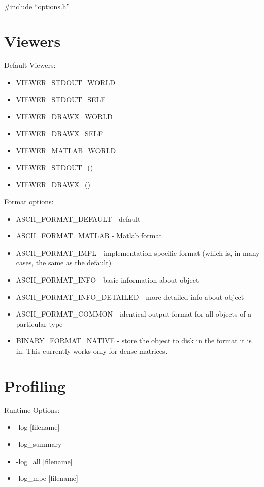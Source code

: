  \\
{  \#include ``options.h''} \\

{\small
\noindent

}

\section{Viewers}

\noindent
Default Viewers:
\begin{itemize}
\item VIEWER\_STDOUT\_WORLD
\item VIEWER\_STDOUT\_SELF
\item VIEWER\_DRAWX\_WORLD
\item VIEWER\_DRAWX\_SELF
\item VIEWER\_MATLAB\_WORLD
\item VIEWER\_STDOUT\_()
\item VIEWER\_DRAWX\_()
\end{itemize}
Format options:
\begin{itemize}
\item ASCII\_FORMAT\_DEFAULT - default
\item ASCII\_FORMAT\_MATLAB - Matlab format
\item  ASCII\_FORMAT\_IMPL - implementation-specific format
      (which is, in many cases, the same as the default)
\item ASCII\_FORMAT\_INFO - basic information about object
\item ASCII\_FORMAT\_INFO\_DETAILED - more detailed info about object
\item ASCII\_FORMAT\_COMMON - identical output format for
       all objects of a particular type
\item BINARY\_FORMAT\_NATIVE - store the object to disk in the format it
      is in. This currently works only for dense matrices.
\end{itemize}

{\small
\noindent

}

\section{Profiling}
Runtime Options:
\begin{itemize}
\item -log [filename]
\item -log\_summary
\item -log\_all [filename]
\item -log\_mpe [filename]
\end{itemize}

